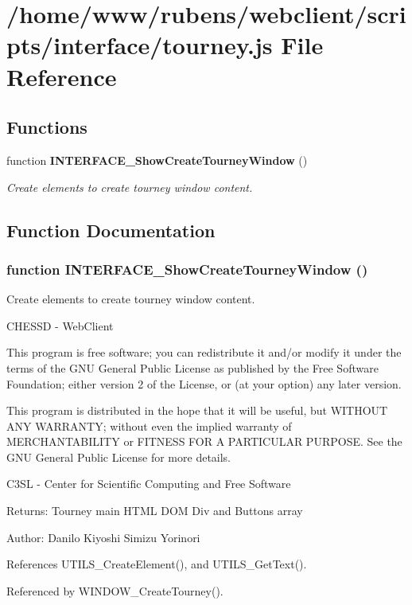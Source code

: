 \section{/home/www/rubens/webclient/scripts/interface/tourney.js File Reference}
\label{tourney_8js}
\subsection*{Functions}
\begin{CompactItemize}
\item 
function {\bf INTERFACE\_\-ShowCreateTourneyWindow} ()
\begin{CompactList}\small\item\em Create elements to create tourney window content. \item\end{CompactList}\end{CompactItemize}


\subsection{Function Documentation}
\subsubsection[INTERFACE\_\-ShowCreateTourneyWindow]{\setlength{\rightskip}{0pt plus 5cm}function INTERFACE\_\-ShowCreateTourneyWindow ()}\label{tourney_8js_2bf74e717dcd3cf95727f78c3643af5b}


Create elements to create tourney window content. 

CHESSD - WebClient

This program is free software; you can redistribute it and/or modify it under the terms of the GNU General Public License as published by the Free Software Foundation; either version 2 of the License, or (at your option) any later version.

This program is distributed in the hope that it will be useful, but WITHOUT ANY WARRANTY; without even the implied warranty of MERCHANTABILITY or FITNESS FOR A PARTICULAR PURPOSE. See the GNU General Public License for more details.

C3SL - Center for Scientific Computing and Free Software \begin{Desc}
\item[Returns:]Tourney main HTML DOM Div and Buttons array \end{Desc}
\begin{Desc}
\item[Author:]Danilo Kiyoshi Simizu Yorinori \end{Desc}


References UTILS\_\-CreateElement(), and UTILS\_\-GetText().

Referenced by WINDOW\_\-CreateTourney().